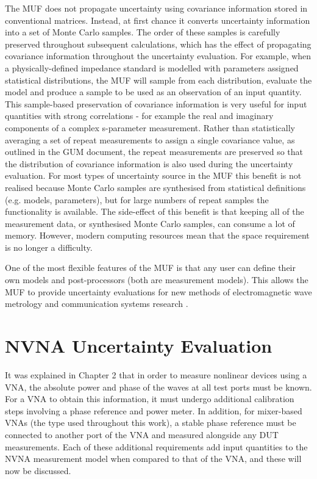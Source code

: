 \documentclass[../thesis/thesis.tex]{subfiles}
\begin{document}
\begin{refsection}
The MUF does not propagate uncertainty using covariance information stored in conventional matrices. Instead, at first chance it converts uncertainty information into a set of Monte Carlo samples. The order of these samples is carefully preserved throughout subsequent calculations, which has the effect of propagating covariance information throughout the uncertainty evaluation. For example, when a physically-defined impedance standard is modelled with parameters assigned statistical distributions, the MUF will sample from each distribution, evaluate the model and produce a sample to be used as an observation of an input quantity. This sample-based preservation of covariance information is very useful for input quantities with strong correlations - for example the real and imaginary components of a complex s-parameter measurement. Rather than statistically averaging a set of repeat measurements to assign a single covariance value, as outlined in the GUM document, the repeat measurements are preserved so that the distribution of covariance information is also used during the uncertainty evaluation. For most types of uncertainty source in the MUF this benefit is not realised because Monte Carlo samples are synthesised from statistical definitions (e.g. models, parameters), but for large numbers of repeat samples the functionality is available. The side-effect of this benefit is that keeping all of the measurement data, or synthesised Monte Carlo samples, can consume a lot of memory. However, modern computing resources mean that the space requirement is no longer a difficulty.

One of the most flexible features of the MUF is that any user can define their own models and post-processors (both are measurement models). This allows the MUF to provide uncertainty evaluations for new methods of electromagnetic wave metrology and communication systems research \cite{Dortmans_2019, Sanders_2019}.

\section{NVNA Uncertainty Evaluation}

It was explained in Chapter 2 that in order to measure nonlinear devices using a VNA, the absolute power and phase of the waves at all test ports must be known. For a VNA to obtain this information, it must undergo additional calibration steps involving a phase reference and power meter. In addition, for mixer-based VNAs (the type used throughout this work), a stable phase reference must be connected to another port of the VNA and measured alongside any DUT measurements. Each of these additional requirements add input quantities to the NVNA measurement model when compared to that of the VNA, and these will now be discussed.


\end{refsection}
\end{document}
